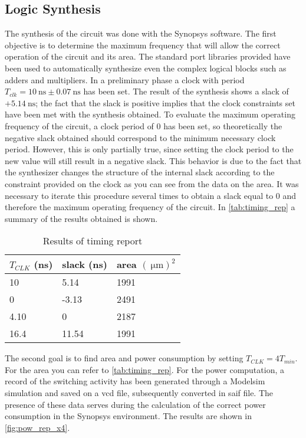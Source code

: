 \subsection{Logic Synthesis}
The synthesis of the circuit was done with the Synopsys software. The first objective is to determine the maximum frequency that will allow the correct operation of the circuit and its area. The standard port libraries provided have been used to automatically synthesize even the complex logical blocks such as adders and multipliers.
In a preliminary phase a clock with period $T_{clk} = \SI{10}{\nano\second} \pm \SI{0.07}{\nano\second}$ has been set. The result of the synthesis shows a slack of $+\SI{5.14}{\nano\second}$; the fact that the slack is positive implies that the clock constraints set have been met with the synthesis obtained.
To evaluate the maximum operating frequency of the circuit, a clock period of 0 has been set, so theoretically the negative slack obtained should correspond to the minimum necessary clock period. However, this is only partially true, since setting the clock period to the new value will still result in a negative slack. This behavior is due to the fact that the synthesizer changes the structure of the internal slack according to the constraint provided on the clock as you can see from the data on the area. It was necessary to iterate this procedure several times to obtain a slack equal to 0 and therefore the maximum operating frequency of the circuit. In \autoref{tab:timing_rep} a summary of the results obtained is shown.

\begin{table}[h]
\begin{center}
\begin{tabular}{|l|l|l|}
\hline
$T_{CLK}$ (ns) & slack (ns) & area $(\SI{}{\micro\meter})^2$ \\
\hline
10 & 5.14 & 1991 \\
0 & -3.13 & 2491 \\
4.10 & 0 & 2187 \\
16.4 & 11.54 & 1991 \\
\hline
\end{tabular}
\end{center}
\caption{Results of timing report}
\label{tab:timing_rep}
\end{table}

The second goal is to find area and power consumption by setting $T_{CLK} = 4 T_{min}$. For the area you can refer to \autoref{tab:timing_rep}. For the power computation, a record of the switching activity has been generated through a Modelsim simulation and saved on a vcd file, subsequently converted in saif file. The presence of these data serves during the calculation of the correct power consumption in the Synopsys environment. The results are shown in \autoref{fig:pow_rep_x4}.

